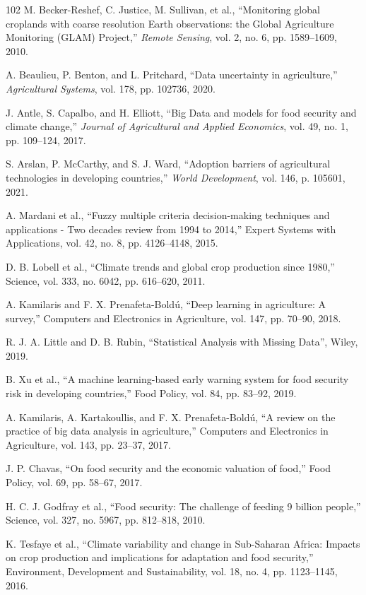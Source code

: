 \documentclass[preprint,12pt]{elsarticle}
\begin{document}
\begin{thebibliography}{102}
		M. Becker-Reshef, C. Justice, M. Sullivan, et al., ``Monitoring global croplands with coarse resolution Earth observations: the Global Agriculture Monitoring (GLAM) Project,'' \emph{Remote Sensing}, vol. 2, no. 6, pp. 1589--1609, 2010.
		
		A. Beaulieu, P. Benton, and L. Pritchard, ``Data uncertainty in agriculture,'' \emph{Agricultural Systems}, vol. 178, pp. 102736, 2020.
		
		J. Antle, S. Capalbo, and H. Elliott, ``Big Data and models for food security and climate change,'' \emph{Journal of Agricultural and Applied Economics}, vol. 49, no. 1, pp. 109--124, 2017.
		
		S. Arslan, P. McCarthy, and S. J. Ward, ``Adoption barriers of agricultural technologies in developing countries,'' \emph{World Development}, vol. 146, p. 105601, 2021.
		
		A. Mardani et al., ``Fuzzy multiple criteria decision-making techniques and applications - Two decades review from 1994 to 2014,'' Expert Systems with Applications, vol. 42, no. 8, pp. 4126--4148, 2015.
		
		D. B. Lobell et al., ``Climate trends and global crop production since 1980,'' Science, vol. 333, no. 6042, pp. 616--620, 2011.
		
		A. Kamilaris and F. X. Prenafeta-Boldú, ``Deep learning in agriculture: A survey,'' Computers and Electronics in Agriculture, vol. 147, pp. 70--90, 2018.
		
		R. J. A. Little and D. B. Rubin, ``Statistical Analysis with Missing Data'', Wiley, 2019.
		
		B. Xu et al., ``A machine learning-based early warning system for food security risk in developing countries,'' Food Policy, vol. 84, pp. 83--92, 2019.
		
		A. Kamilaris, A. Kartakoullis, and F. X. Prenafeta-Boldú, ``A review on the practice of big data analysis in agriculture,'' Computers and Electronics in Agriculture, vol. 143, pp. 23--37, 2017.
		
		J. P. Chavas, ``On food security and the economic valuation of food,'' Food Policy, vol. 69, pp. 58--67, 2017.
		
		H. C. J. Godfray et al., ``Food security: The challenge of feeding 9 billion people,'' Science, vol. 327, no. 5967, pp. 812--818, 2010.
		
		K. Tesfaye et al., ``Climate variability and change in Sub-Saharan Africa: Impacts on crop production and implications for adaptation and food security,'' Environment, Development and Sustainability, vol. 18, no. 4, pp. 1123--1145, 2016.
	\end{thebibliography}
	\fi 
	
	
	
	
\end{document}

